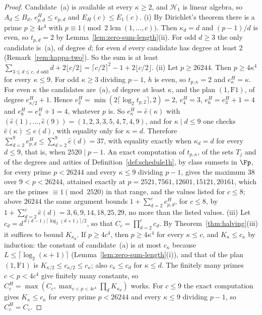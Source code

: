 \begin{proof}
Candidate~(a) is available at every $\kappa \ge 2$, and $\mathcal H_1$ is linear algebra, so $A_d \le B_d$, $e^H_{p,d} \le e_{p,d}$ and $E_H(c) \le E_1(c)$.
(i) By Dirichlet's theorem there is a prime $p \ge 4c^4$ with $p \equiv 1 \pmod{2\operatorname{lcm}(1,\dots,c)}$. Then $\kappa_d = d$ and $(p-1)/d$ is even, so $t_{p,d} = 2$ by Lemma~\ref{lem:zero-sum-length}(ii). For odd $d \ge 3$ the only candidate is~(a), of degree $d$; for even $d$ every candidate has degree at least $2$ (Remark~\ref{rem:kappa-two}). So the sum is at least $\sum_{3 \le d \le c,\ d\text{ odd}}d + 2\lfloor c/2\rfloor = \lceil c/2\rceil^2 - 1 + 2\lfloor c/2\rfloor$.
(ii) Let $p \ge 26244$. Then $p \ge 4\kappa^4$ for every $\kappa \le 9$. For odd $\kappa \ge 3$ dividing $p-1$, $h$ is even, so $t_{p,\kappa} = 2$ and $e^H_\kappa = \kappa$. For even $\kappa$ the candidates are~(a), of degree at least $\kappa$, and the plan $(1,\mathrm{F1})$, of degree $e^H_{\kappa/2}+1$. Hence $e^H_2 = \min(2\lceil\log_2 t_{p,2}\rceil, 2) = 2$, $e^H_4 = 3$, $e^H_6 = e^H_3 + 1 = 4$ and $e^H_8 = e^H_4 + 1 = 4$, whatever $p$ is. So $e^H_\kappa = \hat e(\kappa)$ with $(\hat e(1),\dots,\hat e(9)) = (1,2,3,3,5,4,7,4,9)$, and for $\kappa \mid d \le 9$ one checks $\hat e(\kappa) \le \hat e(d)$, with equality only for $\kappa = d$. Therefore $\sum_{d=2}^9 e^H_{p,d} \le \sum_{d=2}^9\hat e(d) = 37$, with equality exactly when $\kappa_d = d$ for every $d \le 9$, that is, when $2520 \mid p-1$. An exact computation of $t_{p,\kappa}$, of the sets $T_j$ and of the degrees and arities of Definition~\ref{def:schedule1h}, by class sumsets in $\Fp$, for every prime $p < 26244$ and every $\kappa \le 9$ dividing $p-1$, gives the maximum $38$ over $9 < p < 26244$, attained exactly at $p = 2521, 7561, 12601, 15121, 20161$, which are the primes $\equiv 1 \pmod{2520}$ in that range, and the values listed for $c \le 8$; above $26244$ the same argument bounds $1+\sum_{d=2}^ce^H_{p,d}$, for $c \le 8$, by $1+\sum_{d=2}^c\hat e(d) = 3, 6, 9, 14, 18, 25, 29$, no more than the listed values.
(iii) Let $c_d = d^{\,d(d-1)\lceil\log_2(d+1)\rceil/2}$, so that $C_c = \prod_{d=2}^cc_d$. By Theorem~\ref{thm:halving}(iii) it suffices to bound $K_{\kappa_d}$. If $p \ge 4c^4$, then $p \ge 4\kappa^4$ for every $\kappa \le c$, and $K_\kappa \le c_\kappa$ by induction: the constant of candidate~(a) is at most $c_\kappa$ because $L \le \lceil\log_2(\kappa+1)\rceil$ (Lemma~\ref{lem:zero-sum-length}(i)), and that of the plan $(1,\mathrm{F1})$ is $K_{\kappa/2} \le c_{\kappa/2} \le c_\kappa$; also $c_\kappa \le c_d$ for $\kappa \le d$. The finitely many primes $c < p < 4c^4$ give finitely many constants, so $C^H_c = \max(C_c, \max_{c<p<4c^4}\prod_dK_{\kappa_d})$ works. For $c \le 9$ the exact computation gives $K_\kappa \le c_\kappa$ for every prime $p < 26244$ and every $\kappa \le 9$ dividing $p-1$, so $C^H_c = C_c$.
\end{proof}

